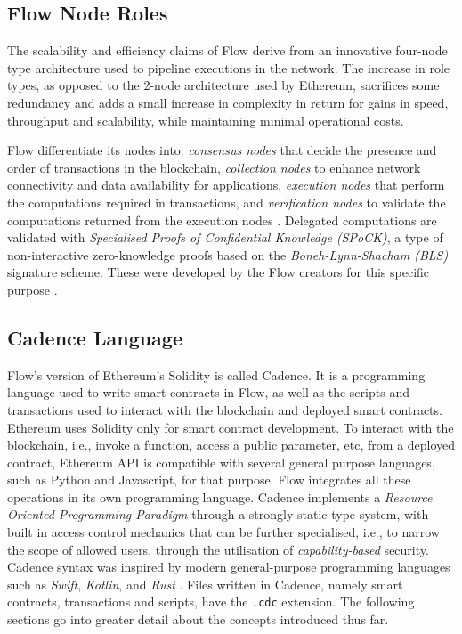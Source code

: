 \documentclass[../NFTComp_IEEE.tex]{subfiles}
\begin{document}
\subsection{Flow Node Roles}
The scalability and efficiency claims of Flow derive from an innovative four-node type architecture used to pipeline executions in the network. The increase in role types, as opposed to the 2-node architecture used by Ethereum, sacrifices some redundancy and adds a small increase in complexity in return for gains in speed, throughput and scalability, while maintaining minimal operational costs.
\par
Flow differentiate its nodes into: \textit{consensus nodes} that decide the presence and order of transactions in the blockchain, \textit{collection nodes} to enhance network connectivity and data availability for applications, \textit{execution nodes} that perform the computations required in transactions, and \textit{verification nodes} to validate the computations returned from the execution nodes \cite{Hentschel2019b}. Delegated computations are validated with \textit{Specialised Proofs of Confidential Knowledge (SPoCK)}, a type of non-interactive zero-knowledge proofs based on the \textit{Boneh-Lynn-Shacham (BLS)} signature scheme. These were developed by the Flow creators for this specific purpose \cite{Ben2020}.

\subsection{Cadence Language}
\label{sec:cadence_language}
Flow's version of Ethereum's Solidity is called Cadence. It is a programming language used to write smart contracts in Flow, as well as the scripts and transactions used to interact with the blockchain and deployed smart contracts. Ethereum uses Solidity only for smart contract development. To interact with the blockchain, i.e., invoke a function, access a public parameter, etc, from a deployed contract, Ethereum API is compatible with several general purpose languages, such as Python and Javascript, for that purpose. Flow integrates all these operations in its own programming language. Cadence implements a \textit{Resource Oriented Programming Paradigm} through a strongly static type system, with built in access control mechanics that can be further specialised, i.e., to narrow the scope of allowed users, through the utilisation of \textit{capability-based} security. Cadence syntax was inspired by modern general-purpose programming languages such as \textit{Swift}, \textit{Kotlin}, and \textit{Rust} \cite{flow2020a} \cite{Cadence2023}. Files written in Cadence, namely smart contracts, transactions and scripts, have the \verb|.cdc| extension. The following sections go into greater detail about the concepts introduced thus far.
\end{document}
